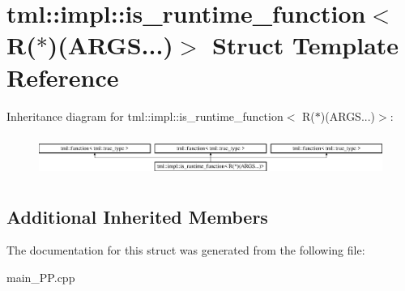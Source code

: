 \hypertarget{structtml_1_1impl_1_1is__runtime__function_3_01R_07_5_08_07ARGS_8_8_8_08_4}{\section{tml\+:\+:impl\+:\+:is\+\_\+runtime\+\_\+function$<$ R($\ast$)(A\+R\+G\+S...)$>$ Struct Template Reference}
\label{structtml_1_1impl_1_1is__runtime__function_3_01R_07_5_08_07ARGS_8_8_8_08_4}
}
Inheritance diagram for tml\+:\+:impl\+:\+:is\+\_\+runtime\+\_\+function$<$ R($\ast$)(A\+R\+G\+S...)$>$\+:\begin{figure}[H]
\begin{center}
\leavevmode
\includegraphics[height=1.362530cm]{structtml_1_1impl_1_1is__runtime__function_3_01R_07_5_08_07ARGS_8_8_8_08_4}
\end{center}
\end{figure}
\subsection*{Additional Inherited Members}


The documentation for this struct was generated from the following file\+:\begin{DoxyCompactItemize}
\item 
main\+\_\+\+P\+P.\+cpp\end{DoxyCompactItemize}
